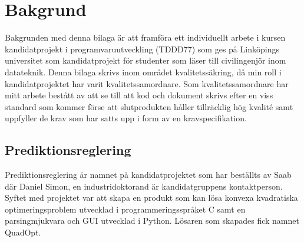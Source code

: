 \section{Bakgrund}
Bakgrunden med denna bilaga är att framföra ett individuellt arbete i kursen kandidatprojekt i programvaruutveckling (TDDD77) som ges på Linköpings universitet som kandidatprojekt för studenter som läser till civilingenjör inom datateknik. 
\newline
\newline
Denna bilaga skrivs inom området kvalitetssäkring, då min roll i kandidatprojektet har varit kvalitetssamordnare. Som kvalitetssamordnare har mitt arbete bestått av att se till att kod och dokument skrivs efter en viss standard som kommer förse att slutprodukten håller tillräcklig hög kvalité samt uppfyller de krav som har satts upp i form av en kravspecifikation.

\subsection{Prediktionsreglering}
Prediktionsreglering är namnet på kandidatprojektet som har beställts av Saab där Daniel Simon, en industridoktorand är kandidatgruppens kontaktperson. Syftet med projektet var att skapa en produkt som kan lösa konvexa kvadratiska optimeringsproblem utvecklad i programmeringsspråket C samt en parsingmjukvara och GUI utvecklad i Python. Lösaren som skapades fick namnet QuadOpt.
